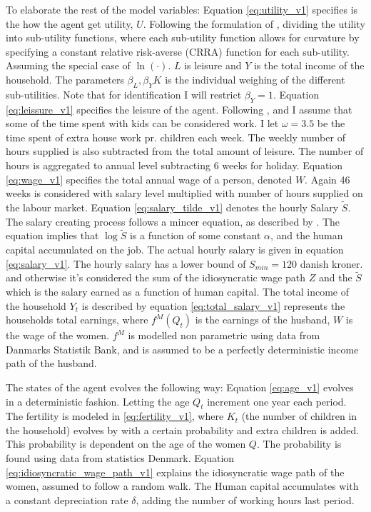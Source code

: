 To elaborate the rest of the model variables: Equation \eqref{eq:utility_v1} specifies is the how the agent get utility, $U$. Following the formulation of \textcite{adda_career_2011}, dividing the utility into sub-utility functions, where each sub-utility function allows for curvature by specifying a constant relative risk-averse (CRRA) function for each sub-utility. Assuming the special case of $\ln(\cdot)$. $L$ is leisure and $Y$ is the total income of the household. The parameters $\beta_L, \beta_YK$ is the individual weighing of the different sub-utilities. Note that for identification I will restrict $\beta_Y= 1$.
Equation \eqref{eq:leissure_v1} specifies the leisure of the agent. Following \textcite{firestone_estimation_1988}, \textcite{thrane_men_2000} and \textcite{ekert-jaffe_time_2015} I assume that some of the time spent with kids can be considered work. I let $\omega=3.5$ be the time spent of extra house work pr. children each week. The weekly number of hours supplied is also subtracted from the total amount of leisure. The number of hours is aggregated to annual level subtracting 6 weeks for holiday. Equation \eqref{eq:wage_v1} specifies the total annual wage of a person, denoted $W$. Again 46 weeks is considered with salary level multiplied with number of hours supplied on the labour market. Equation \eqref{eq:salary_tilde_v1} denotes the hourly Salary $\tilde{S}$. The salary creating process follows a mincer equation, as described by \textcite{lemieux_mincer_2006}. The equation implies that $\log \tilde{S}$ is a function of some constant $\alpha$, and the human capital accumulated on the job. The actual hourly salary is given in equation \eqref{eq:salary_v1}. The hourly salary has a lower bound of $S_{min}=120$ danish kroner. and otherwise it's considered the sum of the idiosyncratic wage path $Z$ and the $\tilde{S}$ which is the salary earned as a function of human capital. The total income of the household $Y_t$ is described by equation \eqref{eq:total_salary_v1} represents the households total earnings, where $f^M(Q_t)$ is the earnings of the husband, $W$ is the wage of the women. $f^M$ is modelled non parametric using data from Danmarks Statistik Bank, and is assumed to be a perfectly deterministic income path of the husband.

The states of the agent evolves the following way: Equation \eqref{eq:age_v1} evolves in a deterministic fashion. Letting the age $Q_t$ increment one year each period. The fertility is modeled in \eqref{eq:fertility_v1}, where $K_t$ (the number of children in the household) evolves by with a certain probability and extra children is added. This probability is dependent on the age of the women $Q$. The probability is found using data from statistics Denmark. Equation \eqref{eq:idiosyncratic_wage_path_v1} explains the idiosyncratic wage path of the women, assumed to follow a random walk. The Human capital accumulates with a constant depreciation rate $\delta$, adding the number of working hours last period.

